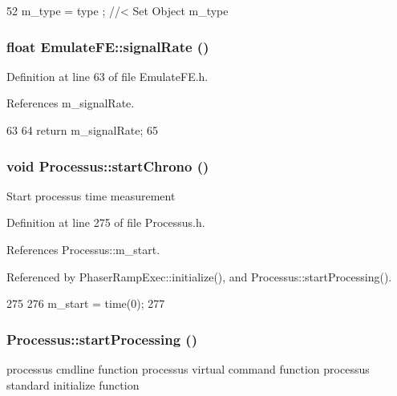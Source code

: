 \begin{DoxyCode}
52 { m_type  = type  ; } //< Set Object m_type
\end{DoxyCode}
\hypertarget{classEmulateFE_a98d2e402e4707109ca14ee9f4d95c2fa}{
\subsubsection[{signalRate}]{\setlength{\rightskip}{0pt plus 5cm}float EmulateFE::signalRate ()}}
\label{classEmulateFE_a98d2e402e4707109ca14ee9f4d95c2fa}


Definition at line 63 of file EmulateFE.h.

References m\_\-signalRate.


\begin{DoxyCode}
63                     {
64     return m_signalRate;
65   }
\end{DoxyCode}
\hypertarget{classProcessus_a5e4d34b86241fa0756e07375a14ff4b2}{
\subsubsection[{startChrono}]{\setlength{\rightskip}{0pt plus 5cm}void Processus::startChrono ()}}
\label{classProcessus_a5e4d34b86241fa0756e07375a14ff4b2}
Start processus time measurement 

Definition at line 275 of file Processus.h.

References Processus::m\_\-start.

Referenced by PhaserRampExec::initialize(), and Processus::startProcessing().


\begin{DoxyCode}
275                     {
276     m_start = time(0);
277   }
\end{DoxyCode}
\hypertarget{classProcessus_a09319bde9bed93e290f69b4e04585543}{
\subsubsection[{startProcessing}]{ Processus::startProcessing ()}}
\label{classProcessus_a09319bde9bed93e290f69b4e04585543}
processus cmdline function processus virtual command function processus standard initialize function 

